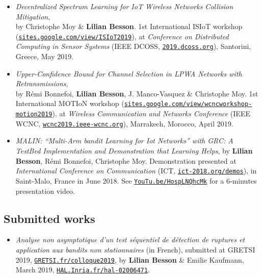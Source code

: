 \begin{itemize}

\item
    \emph{Decentralized Spectrum Learning for IoT Wireless Networks Collision Mitigation},\\
    by Christophe Moy \& \textbf{Lilian Besson}.
    1st International ISIoT workshop (\href{https://sites.google.com/view/ISIoT2019}{\texttt{sites.google.com/view/ISIoT2019}}),
    at \emph{Conference on Distributed Computing in Sensor Systems} (IEEE DCOSS, \href{http://2019.dcoss.org}{\texttt{2019.dcoss.org}}), Santorini, Greece, May 2019.
    \cite{MoyBesson2019}

\item
    \emph{Upper-Confidence Bound for Channel Selection in LPWA Networks with Retransmissions},\\
    by Rémi Bonnefoi, \textbf{Lilian Besson}, J. Manco-Vasquez \& Christophe Moy.
    1st International MOTIoN workshop (\href{https://sites.google.com/view/wcncworkshop-motion2019}{\texttt{sites.google.com/view/wcncworkshop-motion2019}}),
    at \emph{Wireless Communication and Networks Conference} (IEEE WCNC, \href{http://wcnc2019.ieee-wcnc.org}{\texttt{wcnc2019.ieee-wcnc.org}}), Marrakech, Morocco, April 2019.
    \cite{Bonnefoi2019WCNC}

\item
    \emph{MALIN: ``Multi-Arm bandit Learning for Iot Networks'' with GRC: A TestBed Implementation and Demonstration that Learning Helps},
    by \textbf{Lilian Besson}, Rémi Bonnefoi, Christophe Moy.
    Demonstration presented at \emph{International Conference on Communication} (ICT, \href{http://ict-2018.org/demos}{\texttt{ict-2018.org/demos}}), in Saint-Malo, France in June $2018$.
    See \href{https://YouTu.be/HospLNQhcMk}{\texttt{YouTu.be/HospLNQhcMk}} for a $6$-minutes presentation video.
    \cite{Besson2018ICT}

\end{itemize}


\subsection{Submitted works}

\begin{itemize}
\item
    \emph{Analyse non asymptotique d'un test séquentiel de détection de ruptures et application aux bandits non stationnaires} (in French),
    submitted at GRETSI 2019, \href{http://GRETSI.fr/colloque2019}{\texttt{GRETSI.fr/colloque2019}},
    by \textbf{Lilian Besson} \& Emilie Kaufmann, March $2019$,
    \href{https://HAL.Inria.fr/hal-02006471}{\texttt{HAL.Inria.fr/hal-02006471}}.
    \cite{Besson2019Gretsi}

\end{itemize}


